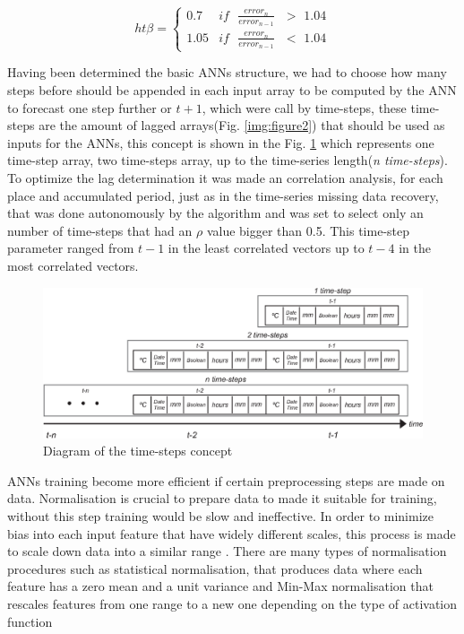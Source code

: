 \begin{equation}
\label{eq:solve18}ht
\beta = \begin{cases}
         0.7 & \text{$if$ $\frac{error_n}{error_{n-1}}$ $>$ 1.04}\\
         1.05 & \text{$if$ $\frac{error_n}{error_{n-1}}$ $<$ 1.04}
        \end{cases}
\end{equation}

Having been determined the basic ANNs structure, we had to choose how many steps before should be appended in each input array to be computed by the ANN to forecast one step further or $t + 1$,
which were call by time-steps, these time-steps are the amount of lagged arrays(Fig. \ref{img:figure2}) that should be used as inputs for the ANNs, this concept is shown in the Fig. \ref{img:figure3} which represents one time-step array,  two time-steps array, up to the time-series length(\textit{n time-steps}). To optimize the lag determination it was made an correlation analysis, for each place and accumulated period, just as in the time-series missing data recovery, that was done autonomously by the algorithm and was set to select only an number of time-steps that had an $\rho$  value bigger than 0.5. This time-step parameter ranged from $t-1$ in the least correlated vectors up to $t-4$ in the most correlated vectors.

\begin{figure}[htb!]
 \centering
 \includegraphics[scale=0.7]{capitulo_2/time_steps}
 \caption{Diagram of the time-steps concept }
 \label{img:figure3}
\end{figure}

\newpage

ANNs training become more efficient if certain preprocessing steps are made on data. Normalisation is crucial to prepare data to made it suitable for training, without this step training would be slow and ineffective. In order to minimize bias into each input feature that have widely different scales, this process is made to scale down data into a similar range \cite{yaldi2009improving}. There are many types of normalisation procedures such as statistical normalisation, that produces data where each feature has a zero mean and a unit variance and Min-Max normalisation that rescales features from one range to a new one depending on the type of activation function    

